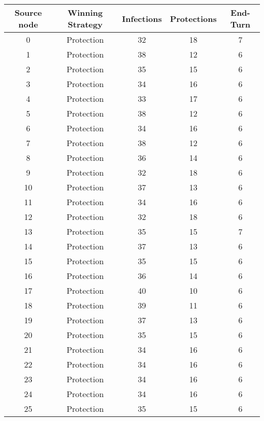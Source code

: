 \documentclass[results.tex]{subfiles}
\begin{document}
\begin{center}
  \begin{tabular}{| c || c | c | c | c |}
    \hline
    {\bfseries Source node} & {\bfseries Winning Strategy} & {\bfseries Infections} & {\bfseries Protections} & {\bfseries End-Turn} \\  %
    \hline\hline
    0 & Protection & 32 & 18 & 7 \\ 
    \hline
    1 & Protection & 38 & 12 & 6 \\ 
    \hline
    2 & Protection & 35 & 15 & 6 \\ 
    \hline
    3 & Protection & 34 & 16 & 6 \\ 
    \hline
    4 & Protection & 33 & 17 & 6 \\ 
    \hline
    5 & Protection & 38 & 12 & 6 \\ 
    \hline
    6 & Protection & 34 & 16 & 6 \\ 
    \hline
    7 & Protection & 38 & 12 & 6 \\ 
    \hline
    8 & Protection & 36 & 14 & 6 \\ 
    \hline
    9 & Protection & 32 & 18 & 6 \\ 
    \hline
    10 & Protection & 37 & 13 & 6 \\ 
    \hline
    11 & Protection & 34 & 16 & 6 \\ 
    \hline
    12 & Protection & 32 & 18 & 6 \\ 
    \hline
    13 & Protection & 35 & 15 & 7 \\ 
    \hline
    14 & Protection & 37 & 13 & 6 \\ 
    \hline
    15 & Protection & 35 & 15 & 6 \\ 
    \hline
    16 & Protection & 36 & 14 & 6 \\ 
    \hline
    17 & Protection & 40 & 10 & 6 \\ 
    \hline
    18 & Protection & 39 & 11 & 6 \\ 
    \hline
    19 & Protection & 37 & 13 & 6 \\ 
    \hline
    20 & Protection & 35 & 15 & 6 \\ 
    \hline
    21 & Protection & 34 & 16 & 6 \\ 
    \hline
    22 & Protection & 34 & 16 & 6 \\ 
    \hline
    23 & Protection & 34 & 16 & 6 \\ 
    \hline
    24 & Protection & 34 & 16 & 6 \\ 
    \hline
    25 & Protection & 35 & 15 & 6 \\ 

\end{tabular}
\end{center}
\end{document}
